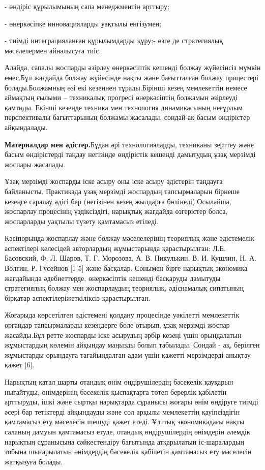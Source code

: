- өндіріс құрылымының сапа менеджментін арттыру;

- өнеркәсіпке инновацияларды уақтылы енгізумен;

- тиімді интеграцияланған құрылымдарды құру;- өзге де стратегиялық
мәселелермен айналысуға тиіс.

Алайда, сапалы жоспарды әзірлеу өнеркәсіптік кешенді болжау жүйесінсіз
мүмкін емес.Бұл жағдайда болжау жүйесінде нақты және бағытталған болжау
процестері болады.Болжамның өзі екі кезеңнен тұрады.Бірінші кезең
мемлекеттің немесе аймақтың ғылыми -- техникалық прогресі өнеркәсіптің
болжамын әзірлеуді қамтиды. Екінші кезеңде техника мен технология
динамикасының неғұрлым перспективалы бағыттарының болжамы жасалады,
сондай-ақ басым өндірістер айқындалады.

{\bfseries Материалдар мен әдістер.}Бұдан әрі технологияларды, техниканы
зерттеу және басым өндірістерді таңдау негізінде өндірістік кешенді
дамытудың ұзақ мерзімді жоспары жасалады.

Ұзақ мерзімді жоспарды іске асыру оны іске асыру әдістерін таңдауға
байланысты. Практикада ұзақ мерзімді жоспардың тапсырмаларын бірнеше
кезеңге саралау әдісі бар (негізінен кезең жылдарға бөлінеді).Осылайша,
жоспарлау процесінің үздіксіздігі, нарықтық жағдайда өзгерістер болса,
жоспарларды уақтылы түзету қамтамасыз етіледі.

Кәсіпорында жоспарлау және болжау мәселелерінің теориялық және
әдістемелік аспектілері келесідей авторлардың жұмыстарында
қарастырылған: Л.Е. Басовский, Ф. Л. Шаров, Т. Г. Морозова, А. В.
Пикулькин, В. И. Кушлин, Н. А. Волгин, Р. Гусейнов {[}1-5{]} және
басқалар. Сонымен бірге нарықтық экономика жағдайында әдебиеттерде,
өнеркәсіптік кешенді басқаруды дамытуды стратегиялық болжау мен
жоспарлаудың теориялық, әдіснамалық сипатының бірқатар
аспектілеріжеткіліксіз қарастырылған.

Жоғарыда көрсетілген әдістемені қолдану процесінде уәкілетті мемлекеттік
органдар тапсырмаларды кезеңдерге бөле отырып, ұзақ мерзімді жоспар
жасайды.Бұл ретте жоспарды іске асырудың әрбір кезеңі үшін орындалатын
жұмыстардың көлемін айқындау маңызды болып табылады. Сондай - ақ,
берілген жұмыстарды орындауға тағайындалған адам үшін қажетті
мерзімдерді анықтау қажет {[}6{]}.

Нарықтың қатал шарты отандық өнім өндірушілердің бәсекелік қауқарын
нығайтуды, өнімдерінің бәсекелік қыспақтарға төтеп берерлік қабілетін
арттыруды, ішкі және сыртқы нарықтарда сұранысы жоғары өнім өндіруге
тиімді әсері бар тетіктерді айқындауды және сол арқылы мемлекеттің
қауіпсіздігін қамтамасыз ету мәселесін шешуді қажет етеді. Ұлттық
экономикадағы нақты саланың дамуын қамтамасыз етуде, отандық
өндірушілердің өнімдерін әлемдік нарықтың сұранысына сәйкестендіру
бағытында атқарылатын іс-шаралардың тобына шығарылатын өнімдердің
бәсекелік қабілетін қамтамасыз ету мәселесін жатқызуға болады.

